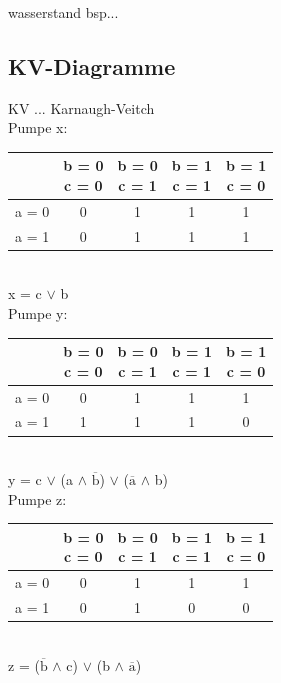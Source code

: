 wasserstand bsp...

\subsection{KV-Diagramme}
KV ... Karnaugh-Veitch \\

Pumpe x: 
\begin{tabular}{c|c|c|c|c}
	& \makecell{b = 0\\c = 0} & \makecell{b = 0\\c = 1} & \makecell{b = 1\\c = 1} & \makecell{b = 1\\c = 0} \\
	\hline
	a = 0 & 0 & 1 & 1 & 1 \\
	\hline
	a = 1 & 0 & 1 & 1 & 1 \\
\end{tabular} \\
x = c $\lor$ b \\

Pumpe y: 
\begin{tabular}{c|c|c|c|c}
	& \makecell{b = 0\\c = 0} & \makecell{b = 0\\c = 1} & \makecell{b = 1\\c = 1} & \makecell{b = 1\\c = 0} \\
	\hline
	a = 0 & 0 & 1 & 1 & 1 \\
	\hline
	a = 1 & 1 & 1 & 1 & 0 \\
\end{tabular} \\
y = c $\lor$ (a $\land$ $\overline{\text{b}}$) $\lor$ ($\overline{\text{a}}$ $\land$ b) \\

Pumpe z: 
\begin{tabular}{c|c|c|c|c}
	& \makecell{b = 0\\c = 0} & \makecell{b = 0\\c = 1} & \makecell{b = 1\\c = 1} & \makecell{b = 1\\c = 0} \\
	\hline
	a = 0 & 0 & 1 & 1 & 1 \\
	\hline
	a = 1 & 0 & 1 & 0 & 0 \\
\end{tabular} \\
z = ($\overline{\text{b}}$ $\land$ c) $\lor$ (b $\land$ $\overline{\text{a}}$) \\


